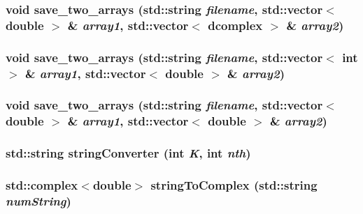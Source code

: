 \subsubsection{\setlength{\rightskip}{0pt plus 5cm}void save\_\-two\_\-arrays (std::string {\em filename}, std::vector$<$ double $>$ \& {\em array1}, std::vector$<$ \bf{dcomplex} $>$ \& {\em array2})}\label{misc_8h_f5ccf41d6f8d69c8f3ba48f994970c7c}


\subsubsection{\setlength{\rightskip}{0pt plus 5cm}void save\_\-two\_\-arrays (std::string {\em filename}, std::vector$<$ int $>$ \& {\em array1}, std::vector$<$ double $>$ \& {\em array2})}\label{misc_8h_7c413bd6d7198a8b0648998a96cfc114}


\subsubsection{\setlength{\rightskip}{0pt plus 5cm}void save\_\-two\_\-arrays (std::string {\em filename}, std::vector$<$ double $>$ \& {\em array1}, std::vector$<$ double $>$ \& {\em array2})}\label{misc_8h_f3d6b86b53e967c47328217c60a7c1dd}


\subsubsection{\setlength{\rightskip}{0pt plus 5cm}std::string string\-Converter (int {\em K}, int {\em nth})}\label{misc_8h_9cd29d9805fac3c5d278f2f3587d79f7}


\subsubsection{\setlength{\rightskip}{0pt plus 5cm}std::complex$<$double$>$ string\-To\-Complex (std::string {\em num\-String})}\label{misc_8h_31bbaf7dd1edf8552b0f4c55bc614c0e}


